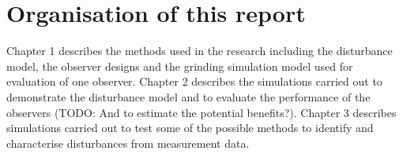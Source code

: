 \section*{Organisation of this report}

Chapter 1 describes the methods used in the research including the disturbance model, the observer designs and the grinding simulation model used for evaluation of one observer.  Chapter 2 describes the simulations carried out to demonstrate the disturbance model and to evaluate the performance of the observers (TODO: And to estimate the potential benefits?). Chapter 3 describes simulations carried out to test some of the possible methods to identify and characterise disturbances from measurement data.
